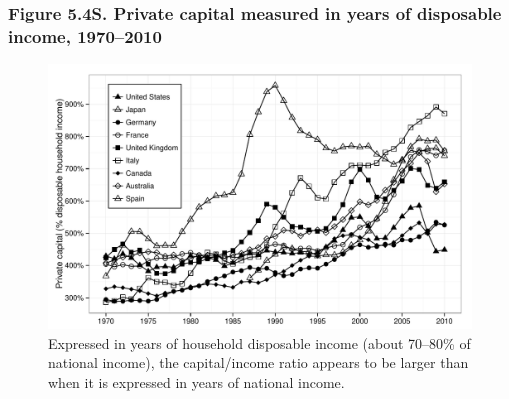 \documentclass[t]{beamer}\usepackage[]{graphicx}\usepackage[]{color}
\newenvironment{knitrout}{}{} %
\begin{document}
\begin{frame}[label=Figure_5_4S]
\frametitle{Figure 5.4S. Private capital measured in years of disposable income, 1970--2010}
\begin{figure}[t]
\begin{minipage}[b]{\textwidth}
\centering
\begin{knitrout}\footnotesize
{}\color{fgcolor}

{\centering \includegraphics[width=1\linewidth]{figures/bw/Figure_5_4S} 

}



\end{knitrout}
\caption{Expressed in years of household disposable income (about 70--80\% of national income), the capital/income ratio appears to be larger than when it is expressed in years of national income.}
\end{minipage}
\end{figure}
\end{frame}
\end{document}

